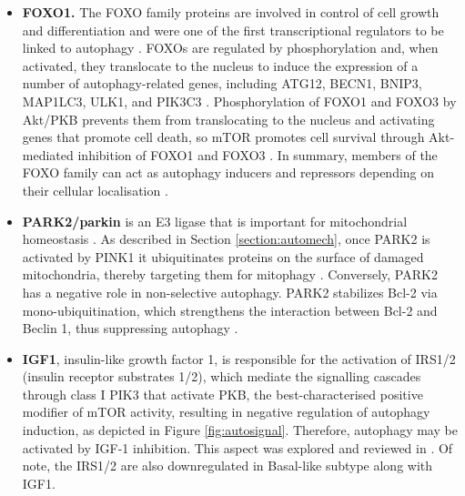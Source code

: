 \begin{itemize}




\item  \textbf{FOXO1.} The FOXO family proteins are involved in control of cell growth and differentiation and were one of the first transcriptional regulators to be linked to autophagy \cite{zhao2007foxo3}. FOXOs are regulated by phosphorylation and, when activated, they translocate to the nucleus to induce the expression of a number of autophagy-related genes, including  ATG12, BECN1, BNIP3, MAP1LC3, ULK1, and PIK3C3 \cite{Feng2015}. Phosphorylation of FOXO1 and FOXO3 by Akt/PKB prevents them from translocating to the nucleus and activating genes that promote cell death, so mTOR promotes cell survival through Akt-mediated inhibition of FOXO1 and FOXO3 \cite{Fullgrabe2016}. In summary, members of the FOXO family can act as autophagy inducers and repressors depending on their cellular localisation \cite{zhao2010cytosolic}.



\item  \textbf{PARK2/parkin} is an E3 ligase that is important for mitochondrial homeostasis \cite{Kroemer2010}.  As described in Section \ref{section:automech}, once PARK2 is activated by PINK1 it ubiquitinates proteins on the surface of damaged mitochondria, thereby targeting them for mitophagy \cite{Feng2015}.  Conversely, PARK2 has a negative role in non-selective autophagy. PARK2 stabilizes Bcl-2 via mono-ubiquitination, which strengthens the interaction between Bcl-2 and Beclin 1, thus suppressing autophagy \cite{chen2010parkin}. 



\item \textbf{IGF1}, insulin-like growth factor 1, is responsible for the activation of IRS1/2 (insulin receptor substrates 1/2), which mediate the signalling cascades through class I PIK3 that activate PKB, the best-characterised positive modifier of mTOR activity, resulting in negative regulation of autophagy induction, as depicted in Figure \ref{fig:autosignal}. Therefore, autophagy may be activated by IGF-1 inhibition. This aspect was explored and reviewed in \cite{renna2013igf}.
Of note, the IRS1/2 are also downregulated in Basal-like subtype along with IGF1. 



 
 
 
 
 
 
 
 

\end{itemize}

